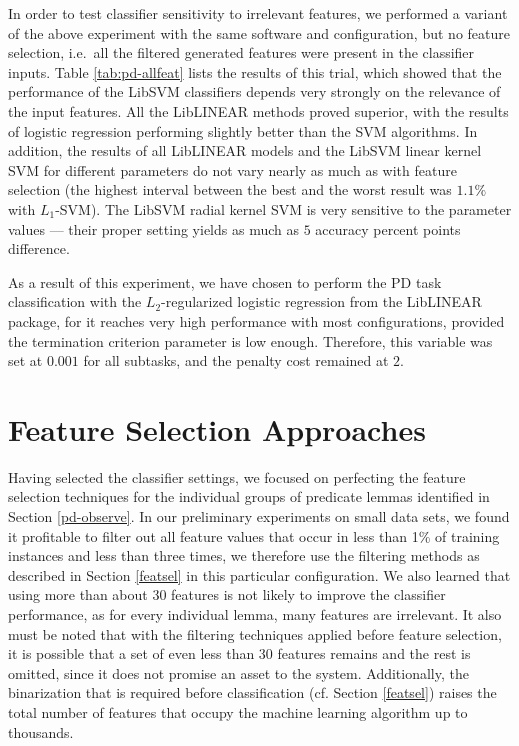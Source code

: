 \documentclass[12pt,notitlepage]{report}
\begin{document}
In order to test classifier sensitivity to irrelevant features, we performed a variant of the above experiment with the same software and configuration, but no feature selection, i.e.\ all the filtered generated features were present in the classifier inputs. Table \ref{tab:pd-allfeat} lists the results of this trial, which showed that the performance of the LibSVM classifiers depends very strongly on the relevance of the input features. All the LibLINEAR methods proved superior, with the results of logistic regression performing slightly better than the SVM algorithms. In addition, the results of all LibLINEAR models and the LibSVM linear kernel SVM for different parameters do not vary nearly as much as with feature selection (the highest interval between the best and the worst result was $1.1\%$ with $L_1$-SVM). The LibSVM radial kernel SVM is very sensitive to the parameter values --- their proper setting yields as much as $5$ accuracy percent points difference. 

As a result of this experiment, we have chosen to perform the PD task classification with the $L_2$-regularized logistic regression from the LibLINEAR package, for it reaches very high performance with most configurations, provided the termination criterion parameter is low enough. Therefore, this variable was set at $0.001$ for all subtasks, and the penalty cost remained at $2$.

\section{Feature Selection Approaches}\label{pd-training}

Having selected the classifier settings, we focused on perfecting the feature selection techniques for the individual groups of predicate lemmas identified in Section \ref{pd-observe}. In our preliminary experiments on small data sets, we found it profitable to filter out all feature values that occur in less than 1\% of training instances and less than three times, we therefore use the filtering methods as described in Section \ref{featsel} in this particular configuration. We also learned that using more than about 30 features is not likely to improve the classifier performance, as for every individual lemma, many features are irrelevant. It also must be noted that with the filtering techniques applied before feature selection, it is possible that a set of even less than 30 features remains and the rest is omitted, since it does not promise an asset to the system. Additionally, the binarization that is required before classification (cf. Section \ref{featsel}) raises the total number of features that occupy the machine learning algorithm up to thousands.
\end{document}
